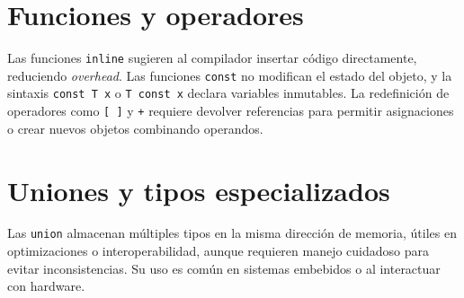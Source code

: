 \documentclass{article}
\begin{document}
\section{Funciones y operadores}
Las funciones \texttt{inline} sugieren al compilador insertar c\'odigo directamente, reduciendo \textit{overhead}. Las funciones \texttt{const} no modifican el estado del objeto, y la sintaxis \texttt{const T x} o \texttt{T const x} declara variables inmutables. La redefinici\'on de operadores como \texttt{[\,]} y \texttt{+} requiere devolver referencias para permitir asignaciones o crear nuevos objetos combinando operandos.

\section{Uniones y tipos especializados}
Las \texttt{union} almacenan m\'ultiples tipos en la misma direcci\'on de memoria, \'utiles en optimizaciones o interoperabilidad, aunque requieren manejo cuidadoso para evitar inconsistencias. Su uso es com\'un en sistemas embebidos o al interactuar con hardware.
\end{document}
